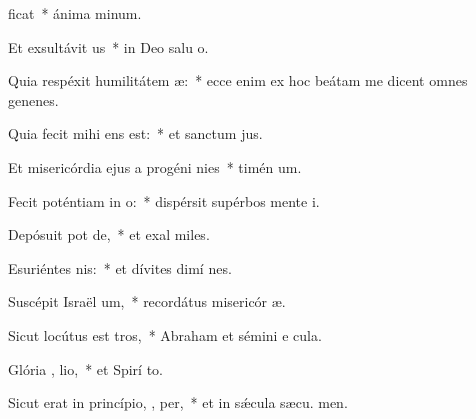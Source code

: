\item {}ficat~* ánima  minum.
\item Et exsultávit  us~* in Deo salu o.
\item Quia respéxit humilitátem  æ:~* ecce enim ex hoc beátam me dicent omnes genenes.
\item Quia fecit mihi   ens est:~* et sanctum  jus.
\item Et misericórdia ejus a progéni  nies~* timén um.
\item Fecit poténtiam in  o:~* dispérsit supérbos mente  i.
\item Depósuit pot  de,~* et exal miles.
\item Esuriéntes  nis:~* et dívites dimí nes.
\item Suscépit Israël  um,~* recordátus misericór æ.
\item Sicut locútus est   tros,~* Abraham et sémini e  cula.
\item Glória ,  lio,~* et Spirí to.
\item Sicut erat in princípio,  ,  per,~* et in sǽcula sæcu. men.
